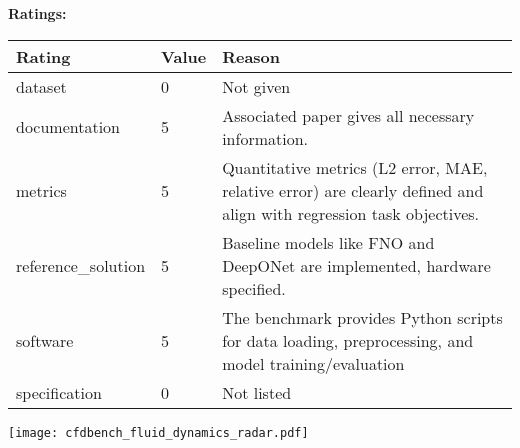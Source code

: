 {{{\bf Ratings:} ~ \\

\begin{tabular}{p{} p{} p{}}
\hline
Rating & Value & Reason \\
\hline
dataset & 0 & Not given
 \\
documentation & 5 & Associated paper gives all necessary information.
 \\
metrics & 5 & Quantitative metrics (L2 error, MAE, relative error) are clearly defined and align with regression task objectives.
 \\
reference\_solution & 5 & Baseline models like FNO and DeepONet are implemented, hardware specified.
 \\
software & 5 & The benchmark provides Python scripts for data loading, preprocessing, and model training/evaluation
 \\
specification & 0 & Not listed
 \\
\hline
\end{tabular}

\texttt{[image: cfdbench\_fluid\_dynamics\_radar.pdf]}
}}
\clearpage